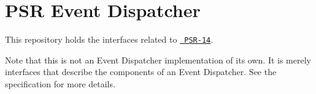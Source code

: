 \chapter{PSR Event Dispatcher}
\hypertarget{md_vendor_2psr_2event-dispatcher_2_r_e_a_d_m_e}{}\label{md_vendor_2psr_2event-dispatcher_2_r_e_a_d_m_e}
This repository holds the interfaces related to \href{http://www.php-fig.org/psr/psr-14/}{\texttt{ PSR-\/14}}.

Note that this is not an Event Dispatcher implementation of its own. It is merely interfaces that describe the components of an Event Dispatcher. See the specification for more details. 
